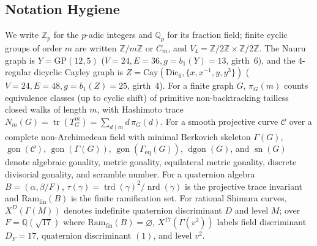 \documentclass[11pt]{amsart}
\numberwithin{equation}{section}
\theoremstyle{plain}
\theoremstyle{definition}\newtheorem{definition}[theorem]{Definition}
\theoremstyle{remark}\newtheorem{remark}[theorem]{Remark}
\newcommand{\Q}{\mathbb{Q}}
\newcommand{\Z}{\mathbb{Z}}
\newcommand{\calC}{\mathcal{C}}
\newcommand{\Cay}{\mathrm{Cay}}
\newcommand{\GP}{\mathrm{GP}}
\newcommand{\Dic}{\mathrm{Dic}}
\newcommand{\Ram}{\mathrm{Ram}}
\newcommand{\nrd}{\operatorname{nrd}}
\newcommand{\trd}{\operatorname{trd}}
\newcommand{\gon}{\operatorname{gon}}
\newcommand{\dgon}{\operatorname{dgon}}
\newcommand{\sn}{\operatorname{sn}}
\begin{document}
\subsection{Notation Hygiene}\label{sec:notation}
We write $\Z_p$ for the $p$-adic integers and $\Q_p$ for its fraction field; finite cyclic groups of order $m$ are written $\Z/m\Z$ or $C_m$, and $V_4 = \Z/2\Z \times \Z/2\Z$. The Nauru graph is $Y = \GP(12,5)$ ($V=24, E=36, g=b_1(Y)=13$, girth~$6$), and the $4$-regular dicyclic Cayley graph is $Z = \Cay(\Dic_6, \{x,x^{-1},y,y^3\})$ ($V=24, E=48, g=b_1(Z)=25$, girth~$4$). For a finite graph $G$, $\pi_G(m)$ counts equivalence classes (up to cyclic shift) of primitive non-backtracking tailless closed walks of length $m$, with Hashimoto trace $N_m(G) = \operatorname{tr}(T_G^m) = \sum_{d\mid m} d\,\pi_G(d)$. For a smooth projective curve $\calC$ over a complete non-Archimedean field with minimal Berkovich skeleton $\Gamma(G)$, $\gon(\calC)$, $\gon(\Gamma(G))$, $\gon(\Gamma_{\mathrm{eq}}(G))$, $\dgon(G)$, and $\sn(G)$ denote algebraic gonality, metric gonality, equilateral metric gonality, discrete divisorial gonality, and scramble number. For a quaternion algebra $B = (\alpha,\beta/F)$, $\tau(\gamma) = \trd(\gamma)^2/\nrd(\gamma)$ is the projective trace invariant and $\Ram_{\mathrm{fin}}(B)$ is the finite ramification set. For rational Shimura curves, $X^D(\Gamma(M))$ denotes indefinite quaternion discriminant $D$ and level $M$; over $F = \Q(\sqrt{17})$ where $\Ram_{\mathrm{fin}}(B) = \varnothing$, $X^{17}(\Gamma(v^2))$ labels field discriminant $D_F=17$, quaternion discriminant $(1)$, and level $v^2$.
\end{document}

